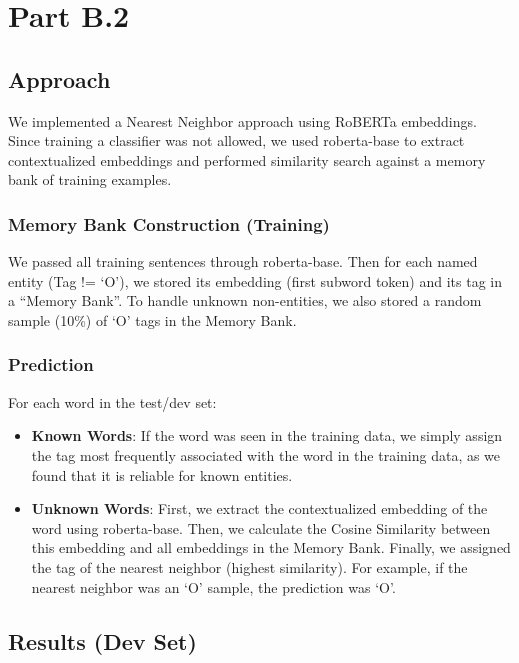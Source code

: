 \documentclass{article}
\title{}
\author{}
\date{}
\begin{document}
\maketitle

\section*{Part B.2}

\subsection*{Approach}
We implemented a Nearest Neighbor approach using RoBERTa embeddings. Since training a classifier was not allowed, we used roberta-base to extract contextualized embeddings and performed similarity search against a memory bank of training examples.

\subsubsection*{Memory Bank Construction (Training)}
We passed all training sentences through roberta-base. Then for each named entity (Tag != `O'), we stored its embedding (first subword token) and its tag in a ``Memory Bank''.
To handle unknown non-entities, we also stored a random sample (10\%) of `O' tags in the Memory Bank.

\subsubsection*{Prediction}
For each word in the test/dev set:
\begin{itemize}
    \item \textbf{Known Words}: If the word was seen in the training data, we simply assign the tag most frequently associated with the word in the training data, as we found that it is reliable for known entities.
    \item \textbf{Unknown Words}: First, we extract the contextualized embedding of the word using roberta-base. Then, we calculate the Cosine Similarity between this embedding and all embeddings in the Memory Bank. Finally, we assigned the tag of the nearest neighbor (highest similarity). For example, if the nearest neighbor was an `O' sample, the prediction was `O'.
\end{itemize}

\subsection*{Results (Dev Set)}
\end{document}
